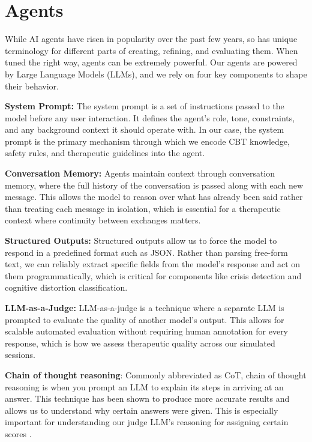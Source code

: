 \documentclass[twoside]{report}
\begin{document}
\section{Agents}

While AI agents have risen in popularity over the past few years, so has unique terminology for different parts of creating, refining, and evaluating them. When tuned the right way, agents can be extremely powerful. Our agents are powered by Large Language Models (LLMs), and we rely on four key components to shape their behavior.

\textbf{System Prompt:} The system prompt is a set of instructions passed to the model before any user interaction. It defines the agent's role, tone, constraints, and any background context it should operate with. In our case, the system prompt is the primary mechanism through which we encode CBT knowledge, safety rules, and therapeutic guidelines into the agent.

\textbf{Conversation Memory:} Agents maintain context through conversation memory, where the full history of the conversation is passed along with each new message. This allows the model to reason over what has already been said rather than treating each message in isolation, which is essential for a therapeutic context where continuity between exchanges matters.

\textbf{Structured Outputs:} Structured outputs allow us to force the model to respond in a predefined format such as JSON. Rather than parsing free-form text, we can reliably extract specific fields from the model's response and act on them programmatically, which is critical for components like crisis detection and cognitive distortion classification.

\textbf{LLM-as-a-Judge:} LLM-as-a-judge is a technique where a separate LLM is prompted to evaluate the quality of another model's output. This allows for scalable automated evaluation without requiring human annotation for every response, which is how we assess therapeutic quality across our simulated sessions.

\textbf{Chain of thought reasoning}: Commonly abbreviated as CoT, chain of thought reasoning is when you prompt an LLM to explain its steps in arriving at an answer. This technique has been shown to produce more accurate results and allows us to understand why certain answers were given. This is especially important for understanding our judge LLM's reasoning for assigning certain scores \cite{wei2022chain}.
\end{document}
